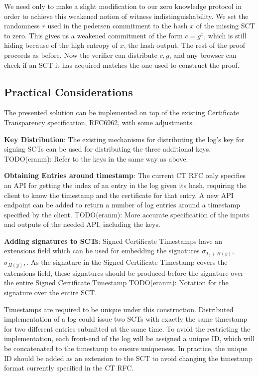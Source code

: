 \documentclass[letterpaper,twocolumn,10pt]{article}
\begin{document}
We need only to make a slight modification to our zero knowledge protocol in order to achieve this weakened notion of witness indistinguishability. We set the randomness $r$ used in the pedersen commitment to the  hash $x$ of the missing SCT to zero. This gives us a weakened commitment of the form $c=g^x$, which is still hiding because of the high entropy of $x$, the hash output. The rest of the proof proceeds as before. Now the verifier can distribute $c,g$, and any browser can check if an SCT it has acquired matches the one used to construct the proof. 

\subsection{Practical Considerations}

The presented solution can be implemented on top of the existing Certificate Transparency specification, RFC6962, with some adjustments.

\textbf{Key Distribution}: The existing mechanisms for distributing the log's key for signing SCTs can be used for distributing the three additional keys. TODO(eranm): Refer to the keys in the same way as above.

\textbf{Obtaining Entries around timestamp}: The current CT RFC only specifies an API for getting the index of an entry in the log given its hash, requiring the client to know the timestamp and the certificate for that entry. A new API endpoint can be added to return a number of log entries around a timestamp specified by the client.
TODO(eranm): More accurate specification of the inputs and outputs of the needed API, including the keys.

\textbf{Adding signatures to SCTs}: Signed Certificate Timestamps have an extensions field which can be used for embedding the signatures $\sigma_{T_y+H(y)},$ $\sigma_{H(y)}, $. As the signature in the Signed Certificate Timestamp covers the extensions field, these signatures should be produced before the signature over the entire Signed Certificate Timestamp TODO(eranm): Notation for the signature over the entire SCT.

Timestamps are required to be unique under this construction. Distributed implementation of a log could issue two SCTs with exactly the same timestamp for two different entries submitted at the same time. To avoid the restricting the implementation, each front-end of the log will be assigned a unique ID, which will be concatenated to the timestamp to ensure uniqueness. In practice, the unique ID should be added as an extension to the SCT to avoid changing the timestamp format currently specified in the CT RFC.
\end{document}
